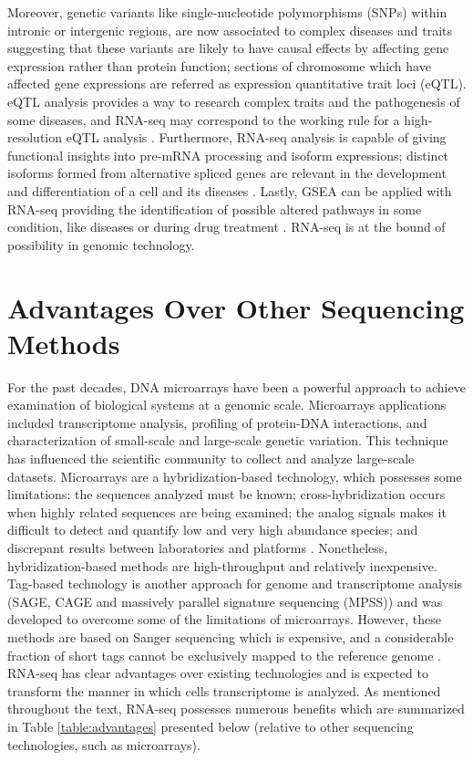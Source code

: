 Moreover, genetic variants like single-nucleotide polymorphisms (SNPs) within intronic or intergenic regions, are now associated to complex diseases and traits suggesting that these variants are likely to have causal effects by affecting gene expression rather than protein function; sections of chromosome which have affected gene expressions are referred as expression quantitative trait loci (eQTL). eQTL analysis provides a way to research complex traits and the pathogenesis of some diseases, and RNA-seq may correspond to the working rule for a high-resolution eQTL analysis \cite{Costa}. Furthermore, RNA-seq analysis is capable of giving functional insights into pre-mRNA processing and isoform expressions; distinct isoforms formed from alternative spliced genes are relevant in the development and differentiation of a cell and its diseases \cite{Katz}. Lastly, GSEA can be applied with RNA-seq providing the identification of possible altered pathways in some condition, like diseases or during drug treatment \cite{Subramanian}. RNA-seq is at the bound of possibility in genomic technology.

\section{Advantages Over Other Sequencing Methods}

For the past decades, DNA microarrays have been a powerful approach to achieve examination of biological systems at a genomic scale. Microarrays applications included transcriptome analysis, profiling of protein-DNA interactions, and characterization of small-scale and large-scale genetic variation. This technique has influenced the scientific community to collect and analyze large-scale datasets. Microarrays are a hybridization-based technology, which possesses some limitations: the sequences analyzed must be known; cross-hybridization occurs when highly related sequences are being examined; the analog signals makes it difficult to detect and quantify low and very high abundance species; and discrepant results between laboratories and platforms \cite{Shendure}. Nonetheless, hybridization-based methods are high-throughput and relatively inexpensive. Tag-based technology is another approach for genome and transcriptome analysis (SAGE, CAGE and massively parallel signature sequencing (MPSS)) and was developed to overcome some of the limitations of microarrays. However, these methods are based on Sanger sequencing which is expensive, and a considerable fraction of short tags cannot be exclusively mapped to the reference genome \cite{Wang}. RNA-seq has clear advantages over existing technologies and is expected to transform the manner in which cells transcriptome is analyzed. As mentioned throughout the text, RNA-seq possesses numerous benefits which are summarized in Table \ref{table:advantages} presented below (relative to other sequencing technologies, such as microarrays).


